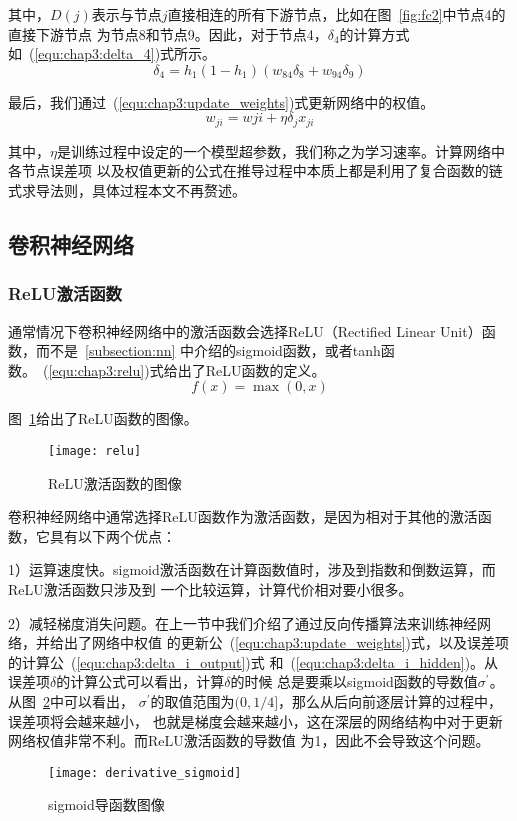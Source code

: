其中，$D(j)$表示与节点$j$直接相连的所有下游节点，比如在图~\ref{fig:fc2}中节点4的直接下游节点
为节点8和节点9。因此，对于节点4，$\delta_4$的计算方式如~(\ref{equ:chap3:delta_4})式所示。
\begin{equation}
  \label{equ:chap3:delta_4}
  \delta_4=h_1(1-h_1)(w_{84}\delta_8+w_{94}\delta_9)
\end{equation}

最后，我们通过~(\ref{equ:chap3:update_weights})式更新网络中的权值。
\begin{equation}
  \label{equ:chap3:update_weights}
  w_{ji} = w{ji} + \eta \delta_j x_{ji}
\end{equation}

其中，$\eta$是训练过程中设定的一个模型超参数，我们称之为学习速率。计算网络中各节点误差项
以及权值更新的公式在推导过程中本质上都是利用了复合函数的链式求导法则，具体过程本文不再赘述。

\subsection{卷积神经网络}
\label{subsection:cnn}

\subsubsection{ReLU激活函数}

通常情况下卷积神经网络中的激活函数会选择ReLU（Rectified Linear Unit）函数，而不是~\ref{subsection:nn}
中介绍的sigmoid函数，或者tanh函数。~(\ref{equ:chap3:relu})式给出了ReLU函数的定义。
\begin{equation}
  \label{equ:chap3:relu}
  f(x) = \max(0, x)
\end{equation}

图~\ref{fig:relu}给出了ReLU函数的图像。
\begin{figure}[ht]
  \centering
  \texttt{[image: relu]}
  \caption{ReLU激活函数的图像}
  \label{fig:relu}
\end{figure}

卷积神经网络中通常选择ReLU函数作为激活函数，是因为相对于其他的激活函数，它具有以下两个优点：

1）运算速度快。sigmoid激活函数在计算函数值时，涉及到指数和倒数运算，而ReLU激活函数只涉及到
一个比较运算，计算代价相对要小很多。

2）减轻梯度消失问题。在上一节中我们介绍了通过反向传播算法来训练神经网络，并给出了网络中权值
的更新公~(\ref{equ:chap3:update_weights})式，以及误差项的计算公~(\ref{equ:chap3:delta_i_output})式
和~(\ref{equ:chap3:delta_i_hidden})。从误差项$\delta$的计算公式可以看出，计算$\delta$的时候
总是要乘以sigmoid函数的导数值$\sigma^\prime$。从图~\ref{fig:derivative_sigmoid}中可以看出，
$\sigma^\prime$的取值范围为$(0, 1/4]$，那么从后向前逐层计算的过程中，误差项将会越来越小，
也就是梯度会越来越小，这在深层的网络结构中对于更新网络权值非常不利。而ReLU激活函数的导数值
为1，因此不会导致这个问题。
\begin{figure}[ht]
  \centering
  \texttt{[image: derivative\_sigmoid]}
  \caption{sigmoid导函数图像}
  \label{fig:derivative_sigmoid}
\end{figure}

